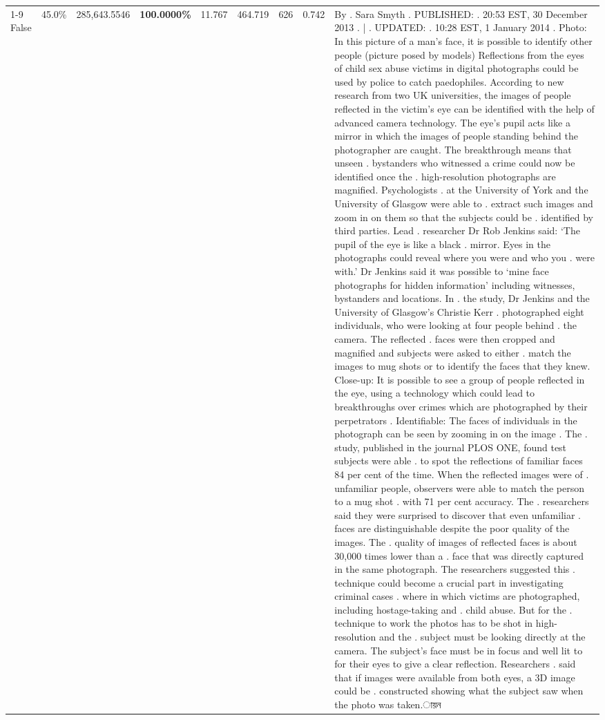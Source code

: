 \begin{table}[H]
\begin{tabular}{lllrlllll}
\cline{1-9}
False & 45.0\% & \color{red} 285,643.5546 & \bfseries \color{red} 100.0000\% & 11.767 & 464.719 & 626 & 0.742 & By . Sara Smyth . PUBLISHED: . 20:53 EST, 30 December 2013 . | . UPDATED: . 10:28 EST, 1 January 2014 . Photo: In this picture of a man's face, it is possible to identify other people (picture posed by models) Reflections from the eyes of child sex abuse victims in digital photographs could be used by police to catch paedophiles. According to new research from two UK universities, the images of people reflected in the victim's eye can be identified with the help of advanced camera technology. The eye's pupil acts like a mirror in which the images of people standing behind the photographer are caught. The breakthrough means that unseen . bystanders who witnessed a crime could now be identified once the . high-resolution photographs are magnified. Psychologists . at the University of York and the University of Glasgow were able to . extract such images and zoom in on them so that the subjects could be . identified by third parties. Lead . researcher Dr Rob Jenkins said: ‘The pupil of the eye is like a black . mirror. Eyes in the photographs could reveal where you were and who you . were with.' Dr Jenkins said it was possible to ‘mine face photographs for hidden information' including witnesses, bystanders and locations. In . the study, Dr Jenkins and the University of Glasgow's Christie Kerr . photographed eight individuals, who were looking at four people behind . the camera. The reflected . faces were then cropped and magnified and subjects were asked to either . match the images to mug shots or to identify the faces that they knew. Close-up: It is possible to see a group of people reflected in the eye, using a technology which could lead to breakthroughs over crimes which are photographed by their perpetrators . Identifiable: The faces of individuals in the photograph can be seen by zooming in on the image . The . study, published in the journal PLOS ONE, found test subjects were able . to spot the reflections of familiar faces 84 per cent of the time. When the reflected images were of . unfamiliar people, observers were able to match the person to a mug shot . with 71 per cent accuracy. The . researchers said they were surprised to discover that even unfamiliar . faces are distinguishable despite the poor quality of the images. The . quality of images of reflected faces is about 30,000 times lower than a . face that was directly captured in the same photograph. The researchers suggested this . technique could become a crucial part in investigating criminal cases . where in which victims are photographed, including hostage-taking and . child abuse. But for the . technique to work the photos has to be shot in high-resolution and the . subject must be looking directly at the camera. The subject's face must be in focus and well lit to for their eyes to give a clear reflection. Researchers . said that if images were available from both eyes, a 3D image could be . constructed showing what the subject saw when the photo was taken.ায়ন \\

\end{tabular}
\end{table}
